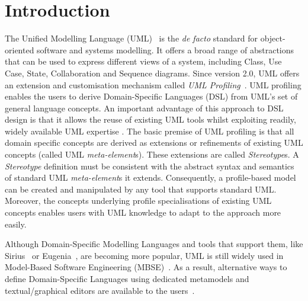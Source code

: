 \section{Introduction}
\label{sec:introduction}

The Unified Modelling Language (UML)~\cite{UML2015OMG} is the \emph{de facto} standard for object-oriented software and systems modelling. 
It offers a broad range of abstractions that can be used to express different views of a system, including Class, Use Case, State, Collaboration and Sequence diagrams. 
Since version 2.0, UML offers an extension and customisation mechanism called \emph{UML Profiling}~\cite{FuentesFernandez2004:UMLME}.
UML profiling enables the users to derive Domain-Specific Languages (DSL) from UML's set of general language concepts.
An important advantage of this approach to DSL design is that it allows the reuse of existing UML tools whilst exploiting readily, widely available UML expertise .
The basic premise of UML profiling is that all domain specific concepts are derived as extensions or refinements of existing UML concepts (called UML \textit{meta-element}s). 
These extensions are called \textit{Stereotype}s. 
A \textit{Stereotype} definition must be consistent with the abstract syntax and semantics of standard UML \textit{meta-element}s it extends. 
Consequently, a profile-based model can be created and manipulated by any tool that supports standard UML. 
Moreover, the concepts underlying profile specialisations of existing UML concepts enables users with UML knowledge to adapt to the approach more easily.

Although Domain-Specific Modelling Languages and tools that support them, like Sirius~\cite{viyovic2014sirius} or Eugenia~\cite{kolovos2015eugenia}, are becoming more popular, UML is still widely used in Model-Based Software Engineering (MBSE)~\cite{erickson2007theoretical}. 
As a result, alternative ways to define Domain-Specific Languages using dedicated metamodels and textual/graphical editors are available to the users~\cite{Bergmayr2014:MODELS,Pardillo2010:MODELS}. 

